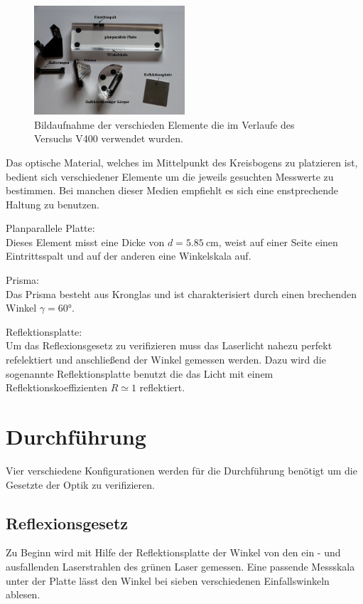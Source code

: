 \begin{figure}
    \centering
    \includegraphics[width=0.5\textwidth]{bilder/teile.png}
    \caption{Bildaufnahme der verschieden Elemente die im Verlaufe des Versuchs V400 verwendet wurden. \cite{skript}} 
    \label{fig:teile}
\end{figure}
\FloatBarrier

Das optische Material, welches im Mittelpunkt des Kreisbogens zu platzieren ist, bedient sich verschiedener Elemente um 
die jeweils gesuchten Messwerte zu bestimmen. Bei manchen dieser Medien empfiehlt es sich eine enstprechende Haltung zu benutzen.
\begin{description}
    \label{idkwhatthisissss}
    \item Planparallele Platte: \\
    Dieses Element misst eine Dicke von $d = \SI{5.85}{\cm}$, weist auf einer Seite einen Eintrittsspalt und auf der anderen 
    eine Winkelskala auf.
    \item Prisma: \\
    Das Prisma besteht aus Kronglas und ist charakterisiert durch einen brechenden Winkel $\gamma = 60 \si{\degree}$.
    \item Reflektionsplatte: \label{lol}\\ 
    Um das Reflexionsgesetz zu verifizieren muss das Laserlicht nahezu perfekt refelektiert und anschließend der Winkel
    gemessen werden. Dazu wird die sogenannte Reflektionsplatte benutzt die das Licht mit einem Reflektionskoeffizienten $R ≃ 1$
    reflektiert.
\end{description}
\newpage
\section{Durchführung}
Vier verschiedene Konfigurationen werden für die Durchführung benötigt um die Gesetzte der Optik zu verifizieren.

\subsection{Reflexionsgesetz}
Zu Beginn wird mit Hilfe der Reflektionsplatte der Winkel von den ein - und ausfallenden Laserstrahlen des grünen Laser gemessen. 
Eine passende Messskala unter der Platte lässt den Winkel bei sieben verschiedenen Einfallswinkeln ablesen.

